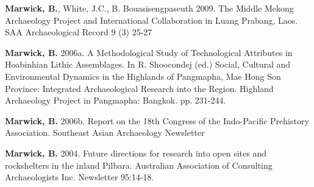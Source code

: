 \documentclass[11pt,article,oneside]{memoir}
\begin{document}
\ind \textbf{Marwick, B.}, White, J.C., B. Bouasisengpaseuth 2009. The Middle Mekong Archaeology Project and International Collaboration in Luang Prabang, Laos. SAA Archaeological Record 9 (3) 25-27

\ind \textbf{Marwick, B.} 2006a. A Methodological Study of Technological Attributes in Hoabinhian Lithic Assemblages. In R. Shoocondej (ed.)  Social, Cultural and Environmental Dynamics in the Highlands of Pangmapha, Mae Hong Son Province: Integrated Archaeological Research into the Region. Highland Archaeology Project in Pangmapha: Bangkok. pp. 231-244. 

\ind \textbf{Marwick, B.} 2006b. Report on the 18th Congress of the Indo-Pacific Prehistory Association. Southeast Asian Archaeology Newsletter

\ind \textbf{Marwick, B.} 2004. Future directions for research into open sites and rockshelters in the inland Pilbara. Australian Association of Consulting Archaeologists Inc. Newsletter 95:14-18.
\end{document}

